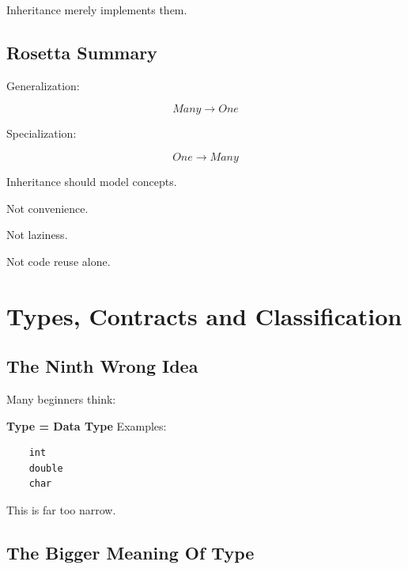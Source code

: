 \documentclass[11pt,a4paper]{book}
\begin{document}
Inheritance merely implements them.


\section{Rosetta Summary}

Generalization:

\[
Many
\rightarrow
One
\]


Specialization:

\[
One
\rightarrow
Many
\]


Inheritance should model concepts.

Not convenience.

Not laziness.

Not code reuse alone.

\chapter{Types, Contracts and Classification}

\section{The Ninth Wrong Idea}

\begin{trap}

Many beginners think:

    \textbf{\textcolor{RosettaRoyalPurple}{Type} = \textcolor{RosettaSeaGreen}{Data Type}}
\newline
Examples:

\begin{verbatim}
    int
    double
    char
\end{verbatim}

This is far too narrow.

\end{trap}


\section{The Bigger Meaning Of Type}
\end{document}
